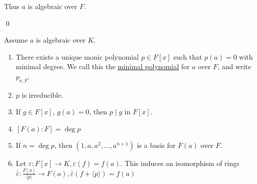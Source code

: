 \documentclass[x11names,reqno,14pt]{extarticle}
\begin{document}
Thus $a$ is algebraic over $F$. 

\qed

\thm 

Assume $a$ is algebraic over $K$.
\begin{enumerate}[label=(\roman*)]

\item There exists a unique monic polynomial $p \in F[x]$ such that $p(a) = 0$ with minimal degree. We call this the \underline{minimal polynomial} for $a$ over $F$, and write $p_{a, F}$. 

\item $p$ is irreducible.

\item If $g \in F[x]$, $g(a) = 0$, then $p \mid g$ in $F[x]$.

\item $[F(a):F] = \deg p$

\item If $n = \deg p$, then $(1, a, a^2, \dots, a^{n + 1})$ is a basis for $F(a)$ over $F$. 

\item Let $\varepsilon:F[x]\to K, \varepsilon(f) = f(a)$. This induces an isomorphism of rings $\bar{\varepsilon}:\frac{F[x]}{\langle p \rangle} \to F(a), \bar{\varepsilon}(f + \langle p \rangle) = f(a)$

\end{enumerate}

\proof\,
\end{document}
